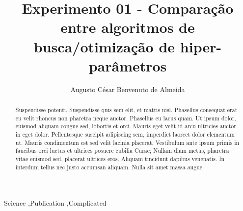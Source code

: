 \documentclass[preprint,12pt]{elsarticle}
\begin{document}
\begin{frontmatter}



\title{Experimento 01 - Comparação entre algoritmos de busca/otimização de hiper-parâmetros}


\author{Augusto César Benvenuto de Almeida}

\begin{abstract}
Suspendisse potenti. Suspendisse quis sem elit, et mattis nisl. Phasellus consequat erat eu velit rhoncus non pharetra neque auctor. Phasellus eu lacus quam. Ut ipsum dolor, euismod aliquam congue sed, lobortis et orci. Mauris eget velit id arcu ultricies auctor in eget dolor. Pellentesque suscipit adipiscing sem, imperdiet laoreet dolor elementum ut. Mauris condimentum est sed velit lacinia placerat. Vestibulum ante ipsum primis in faucibus orci luctus et ultrices posuere cubilia Curae; Nullam diam metus, pharetra vitae euismod sed, placerat ultrices eros. Aliquam tincidunt dapibus venenatis. In interdum tellus nec justo accumsan aliquam. Nulla sit amet massa augue.
\end{abstract}

\begin{keyword}
Science \sep Publication \sep Complicated


\end{keyword}

\end{frontmatter}
\end{document}
